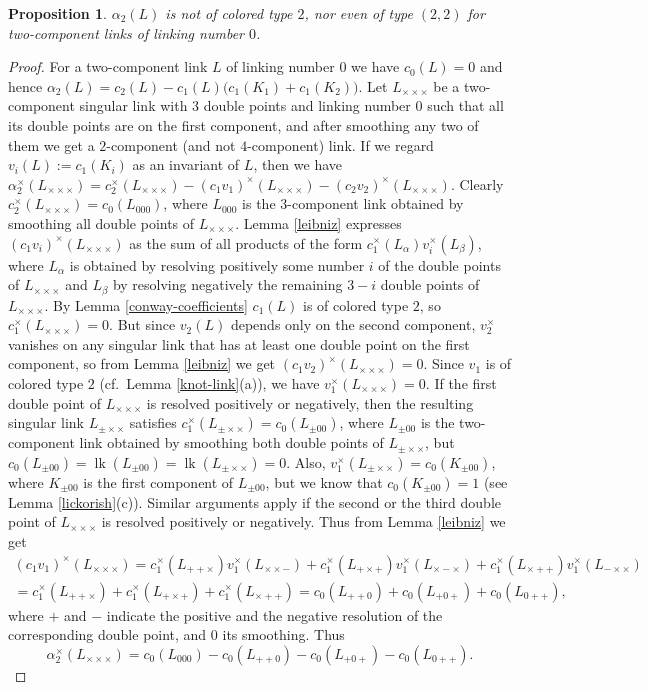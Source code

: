 \documentclass[a4paper,12pt,reqno,oneside]{amsart} %
\theoremstyle{plain}
\newtheorem{proposition}[theorem]{Proposition}
\theoremstyle{definition}
\theoremstyle{named}
\def\x{\times}
\renewcommand{\:}{\colon}
\DeclareMathOperator{\lk}{lk}
\begin{document}
\begin{proposition} \label{ctype2} $\alpha_2(L)$ is not of colored type $2$, nor even of type $(2,2)$ for two-component links 
of linking number $0$.
\end{proposition}

\begin{proof} For a two-component link $L$ of linking number $0$ we have $c_0(L)=0$ and hence 
$\alpha_2(L)=c_2(L)-c_1(L)\big(c_1(K_1)+c_1(K_2)\big)$.
Let $L_{\x\x\x}$ be a two-component singular link with $3$ double points and linking number $0$ such that all its double points 
are on the first component, and after smoothing any two of them we get a $2$-component (and not $4$-component) link.
If we regard $v_i(L):=c_1(K_i)$ as an invariant of $L$, then we have 
$\alpha_2^\x(L_{\x\x\x})=c_2^\x(L_{\x\x\x})-(c_1v_1)^\x(L_{\x\x\x})-(c_2v_2)^\x(L_{\x\x\x})$.
Clearly $c_2^\x(L_{\x\x\x})=c_0(L_{000})$, where $L_{000}$ is the $3$-component link obtained by smoothing all double points 
of $L_{\x\x\x}$.
Lemma \ref{leibniz} expresses $(c_1v_i)^\x(L_{\x\x\x})$ as the sum of all products 
of the form $c_1^\x(L_\alpha)v_i^\x(L_\beta)$, where $L_\alpha$ is obtained by resolving positively some number $i$ of 
the double points of $L_{\x\x\x}$ and $L_\beta$ by resolving negatively the remaining $3-i$ double points of $L_{\x\x\x}$.
By Lemma \ref{conway-coefficients} $c_1(L)$ is of colored type $2$, so $c_1^\x(L_{\x\x\x})=0$.
But since $v_2(L)$ depends only on the second component, $v_2^\x$ vanishes on any singular link that has at least one 
double point on the first component, so from Lemma \ref{leibniz} we get $(c_1v_2)^\x(L_{\x\x\x})=0$.
Since $v_1$ is of colored type $2$ (cf.\ Lemma \ref{knot-link}(a)), we have $v_1^\x(L_{\x\x\x})=0$.
If the first double point of $L_{\x\x\x}$ is resolved positively or negatively, 
then the resulting singular link $L_{\pm\x\x}$ satisfies $c_1^\x(L_{\pm\x\x})=c_0(L_{\pm00})$, where $L_{\pm00}$ is the 
two-component link obtained by smoothing both double points of $L_{\pm\x\x}$, but $c_0(L_{\pm00})=\lk(L_{\pm00})=\lk(L_{\pm\x\x})=0$.
Also, $v_1^\x(L_{\pm\x\x})=c_0(K_{\pm00})$, where $K_{\pm00}$ is the first component of $L_{\pm00}$,
but we know that $c_0(K_{\pm00})=1$ (see Lemma \ref{lickorish}(c)).
Similar arguments apply if the second or the third double point of $L_{\x\x\x}$ is resolved positively or negatively.
Thus from Lemma \ref{leibniz} we get 
\begin{multline*}
(c_1v_1)^\x(L_{\x\x\x})=c_1^\x(L_{++\x})v_1^\x(L_{\x\x-})+c_1^\x(L_{+\x+})v_1^\x(L_{\x-\x})+c_1^\x(L_{\x++})v_1^\x(L_{-\x\x})\\
=c_1^\x(L_{++\x})+c_1^\x(L_{+\x+})+c_1^\x(L_{\x++})=c_0(L_{++0})+c_0(L_{+0+})+c_0(L_{0++}),
\end{multline*}
where $+$ and $-$ indicate the positive and the negative resolution of the corresponding double point, and $0$ its smoothing.
Thus \[\alpha_2^\x(L_{\x\x\x})=c_0(L_{000})-c_0(L_{++0})-c_0(L_{+0+})-c_0(L_{0++}).\]


\end{proof}
\end{document}
